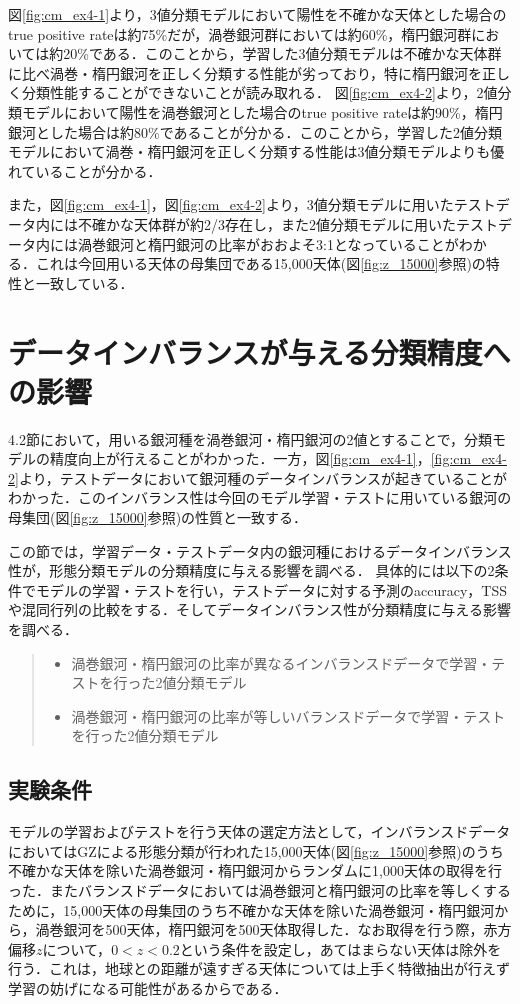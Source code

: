 \documentclass[a4j, 11pt]{jreport}
\begin{document}
図\ref{fig:cm_ex4-1}より，3値分類モデルにおいて陽性を不確かな天体とした場合のtrue positive rateは約75\%だが，渦巻銀河群においては約60\%，楕円銀河群においては約20\%である．このことから，学習した3値分類モデルは不確かな天体群に比べ渦巻・楕円銀河を正しく分類する性能が劣っており，特に楕円銀河を正しく分類性能することができないことが読み取れる．
図\ref{fig:cm_ex4-2}より，2値分類モデルにおいて陽性を渦巻銀河とした場合のtrue positive rateは約90\%，楕円銀河とした場合は約80\%であることが分かる．このことから，学習した2値分類モデルにおいて渦巻・楕円銀河を正しく分類する性能は3値分類モデルよりも優れていることが分かる．

また，図\ref{fig:cm_ex4-1}，図\ref{fig:cm_ex4-2}より，3値分類モデルに用いたテストデータ内には不確かな天体群が約2/3存在し，また2値分類モデルに用いたテストデータ内には渦巻銀河と楕円銀河の比率がおおよそ3:1となっていることがわかる．これは今回用いる天体の母集団である15,000天体(図\ref{fig:z_15000}参照)の特性と一致している．

\section{データインバランスが与える分類精度への影響}
4.2節において，用いる銀河種を渦巻銀河・楕円銀河の2値とすることで，分類モデルの精度向上が行えることがわかった．一方，図\ref{fig:cm_ex4-1}，\ref{fig:cm_ex4-2}より，テストデータにおいて銀河種のデータインバランスが起きていることがわかった．このインバランス性は今回のモデル学習・テストに用いている銀河の母集団(図\ref{fig:z_15000}参照)の性質と一致する．

この節では，学習データ・テストデータ内の銀河種におけるデータインバランス性が，形態分類モデルの分類精度に与える影響を調べる．
具体的には以下の2条件でモデルの学習・テストを行い，テストデータに対する予測のaccuracy，TSSや混同行列の比較をする．そしてデータインバランス性が分類精度に与える影響を調べる．

\begin{quote}
 \begin{itemize}
	\item 渦巻銀河・楕円銀河の比率が異なるインバランスドデータで学習・テストを行った2値分類モデル
	\item 渦巻銀河・楕円銀河の比率が等しいバランスドデータで学習・テストを行った2値分類モデル
 \end{itemize}
\end{quote}

\subsection{実験条件}
モデルの学習およびテストを行う天体の選定方法として，インバランスドデータにおいてはGZによる形態分類が行われた15,000天体(図\ref{fig:z_15000}参照)のうち不確かな天体を除いた渦巻銀河・楕円銀河からランダムに1,000天体の取得を行った．またバランスドデータにおいては渦巻銀河と楕円銀河の比率を等しくするために，15,000天体の母集団のうち不確かな天体を除いた渦巻銀河・楕円銀河から，渦巻銀河を500天体，楕円銀河を500天体取得した．なお取得を行う際，赤方偏移$z$について，$0 < z < 0.2$という条件を設定し，あてはまらない天体は除外を行う．これは，地球との距離が遠すぎる天体については上手く特徴抽出が行えず学習の妨げになる可能性があるからである．
\end{document}
